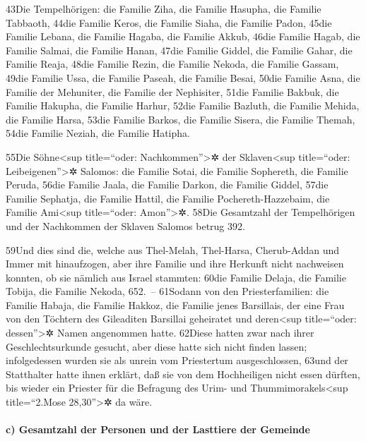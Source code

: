 43Die Tempelhörigen: die Familie Ziha, die Familie Hasupha, die Familie
Tabbaoth, 44die Familie Keros, die Familie Siaha, die Familie Padon,
45die Familie Lebana, die Familie Hagaba, die Familie Akkub, 46die
Familie Hagab, die Familie Salmai, die Familie Hanan, 47die Familie
Giddel, die Familie Gahar, die Familie Reaja, 48die Familie Rezin, die
Familie Nekoda, die Familie Gassam, 49die Familie Ussa, die Familie
Paseah, die Familie Besai, 50die Familie Asna, die Familie der
Mehuniter, die Familie der Nephisiter, 51die Familie Bakbuk, die Familie
Hakupha, die Familie Harhur, 52die Familie Bazluth, die Familie Mehida,
die Familie Harsa, 53die Familie Barkos, die Familie Sisera, die Familie
Themah, 54die Familie Neziah, die Familie Hatipha.

55Die Söhne\textless sup title=``oder: Nachkommen''\textgreater✲ der
Sklaven\textless sup title=``oder: Leibeigenen''\textgreater✲ Salomos:
die Familie Sotai, die Familie Sophereth, die Familie Peruda, 56die
Familie Jaala, die Familie Darkon, die Familie Giddel, 57die Familie
Sephatja, die Familie Hattil, die Familie Pochereth-Hazzebaim, die
Familie Ami\textless sup title=``oder: Amon''\textgreater✲. 58Die
Gesamtzahl der Tempelhörigen und der Nachkommen der Sklaven Salomos
betrug 392.

59Und dies sind die, welche aus Thel-Melah, Thel-Harsa, Cherub-Addan und
Immer mit hinaufzogen, aber ihre Familie und ihre Herkunft nicht
nachweisen konnten, ob sie nämlich aus Israel stammten: 60die Familie
Delaja, die Familie Tobija, die Familie Nekoda, 652.~-- 61Sodann von den
Priesterfamilien: die Familie Habaja, die Familie Hakkoz, die Familie
jenes Barsillais, der eine Frau von den Töchtern des Gileaditen
Barsillai geheiratet und deren\textless sup title=``oder:
dessen''\textgreater✲ Namen angenommen hatte. 62Diese hatten zwar nach
ihrer Geschlechtsurkunde gesucht, aber diese hatte sich nicht finden
lassen; infolgedessen wurden sie als unrein vom Priestertum
ausgeschlossen, 63und der Statthalter hatte ihnen erklärt, daß sie von
dem Hochheiligen nicht essen dürften, bis wieder ein Priester für die
Befragung des Urim- und Thummimorakels\textless sup title=``2.Mose
28,30''\textgreater✲ da wäre.

\hypertarget{c-gesamtzahl-der-personen-und-der-lasttiere-der-gemeinde}{%
\paragraph{c) Gesamtzahl der Personen und der Lasttiere der
Gemeinde}\label{c-gesamtzahl-der-personen-und-der-lasttiere-der-gemeinde}}

